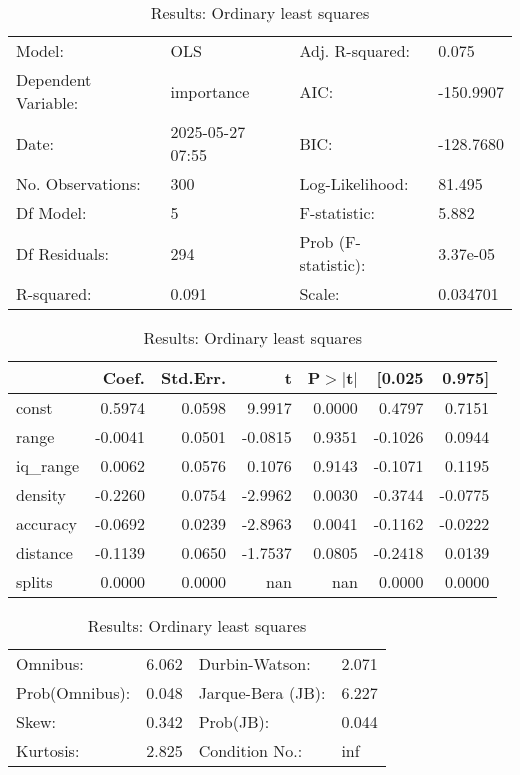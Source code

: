 \begin{table}
\caption{Results: Ordinary least squares}
\label{}
\begin{center}
\begin{tabular}{llll}
\hline
Model:              & OLS              & Adj. R-squared:     & 0.075      \\
Dependent Variable: & importance       & AIC:                & -150.9907  \\
Date:               & 2025-05-27 07:55 & BIC:                & -128.7680  \\
No. Observations:   & 300              & Log-Likelihood:     & 81.495     \\
Df Model:           & 5                & F-statistic:        & 5.882      \\
Df Residuals:       & 294              & Prob (F-statistic): & 3.37e-05   \\
R-squared:          & 0.091            & Scale:              & 0.034701   \\
\hline
\end{tabular}
\end{center}

\begin{center}
\begin{tabular}{lrrrrrr}
\hline
          &   Coef. & Std.Err. &       t & P$> |$t$|$ &  [0.025 &  0.975]  \\
\hline
const     &  0.5974 &   0.0598 &  9.9917 &      0.0000 &  0.4797 &  0.7151  \\
range     & -0.0041 &   0.0501 & -0.0815 &      0.9351 & -0.1026 &  0.0944  \\
iq\_range &  0.0062 &   0.0576 &  0.1076 &      0.9143 & -0.1071 &  0.1195  \\
density   & -0.2260 &   0.0754 & -2.9962 &      0.0030 & -0.3744 & -0.0775  \\
accuracy  & -0.0692 &   0.0239 & -2.8963 &      0.0041 & -0.1162 & -0.0222  \\
distance  & -0.1139 &   0.0650 & -1.7537 &      0.0805 & -0.2418 &  0.0139  \\
splits    &  0.0000 &   0.0000 &     nan &         nan &  0.0000 &  0.0000  \\
\hline
\end{tabular}
\end{center}

\begin{center}
\begin{tabular}{llll}
\hline
Omnibus:       & 6.062 & Durbin-Watson:    & 2.071  \\
Prob(Omnibus): & 0.048 & Jarque-Bera (JB): & 6.227  \\
Skew:          & 0.342 & Prob(JB):         & 0.044  \\
Kurtosis:      & 2.825 & Condition No.:    & inf    \\
\hline
\end{tabular}
\end{center}
\end{table}
